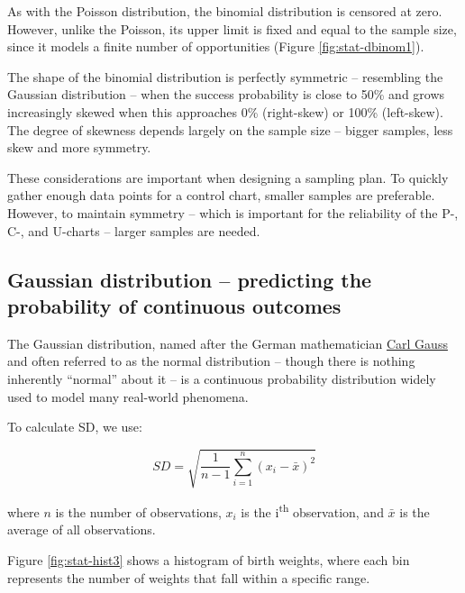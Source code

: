 \documentclass[
]{book}
\newenvironment{Shaded}{\begin{snugshade}}{\end{snugshade}}
\newcommand{\AttributeTok}[1]{\textcolor[rgb]{0.13,0.29,0.53}{#1}}
\newcommand{\DecValTok}[1]{\textcolor[rgb]{0.00,0.00,0.81}{#1}}
\newcommand{\FunctionTok}[1]{\textcolor[rgb]{0.13,0.29,0.53}{\textbf{#1}}}
\newcommand{\NormalTok}[1]{#1}
\newcommand{\SpecialCharTok}[1]{\textcolor[rgb]{0.81,0.36,0.00}{\textbf{#1}}}
\begin{document}
As with the Poisson distribution, the binomial distribution is censored at zero. However, unlike the Poisson, its upper limit is fixed and equal to the sample size, since it models a finite number of opportunities (Figure \ref{fig:stat-dbinom1}).

The shape of the binomial distribution is perfectly symmetric -- resembling the Gaussian distribution -- when the success probability is close to 50\% and grows increasingly skewed when this approaches 0\% (right-skew) or 100\% (left-skew). The degree of skewness depends largely on the sample size -- bigger samples, less skew and more symmetry.

These considerations are important when designing a sampling plan. To quickly gather enough data points for a control chart, smaller samples are preferable. However, to maintain symmetry -- which is important for the reliability of the P-, C-, and U-charts -- larger samples are needed.

\subsection{Gaussian distribution -- predicting the probability of continuous outcomes}\label{gaussian-distribution-predicting-the-probability-of-continuous-outcomes}

The Gaussian distribution, named after the German mathematician \href{https://en.wikipedia.org/wiki/Carl_Friedrich_Gauss}{Carl Gauss} and often referred to as the normal distribution -- though there is nothing inherently ``normal'' about it -- is a continuous probability distribution widely used to model many real-world phenomena.

To calculate SD, we use:

\[
SD = \sqrt{\frac{1}{n - 1} \sum_{i=1}^{n} (x_i - \bar{x})^2}
\]

where \(n\) is the number of observations, \(x_i\) is the i\textsuperscript{th} observation, and \(\bar{x}\) is the average of all observations.

Figure \ref{fig:stat-hist3} shows a histogram of birth weights, where each bin represents the number of weights that fall within a specific range.

\begin{Shaded}
\end{Shaded}
\end{document}
